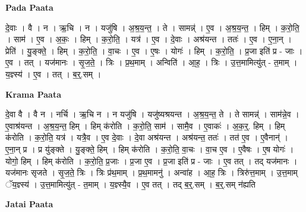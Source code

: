 \documentclass[17pt]{extarticle}
\begin{document}
\textbf{Pada Paata} \newline

दे॒वाः । वै । न । ऋ॒चि । न । यजु॑षि । अ॒श्र॒य॒न्त॒ । ते । सामन्न्॑ । ए॒व । अ॒श्र॒य॒न्त॒ । हिम् । क॒रो॒ति॒ । साम॑ । ए॒व । अ॒कः॒ । हिम् । क॒रो॒ति॒ । यत्र॑ । ए॒व । दे॒वाः । अश्र॑यन्त । ततः॑ । ए॒व । ए॒ना॒न् । प्रेति॑ । यु॒ङ्क्ते॒ । हिम् । क॒रो॒ति॒ । वा॒चः । ए॒व । ए॒षः । योगः॑ । हिम् । क॒रो॒ति॒ । प्र॒जा इति॑ प्र - जाः । ए॒व । तत् । यज॑मानः । सृ॒ज॒ते॒ । त्रिः । प्र॒थ॒माम् । अन्विति॑ । आ॒ह॒ । त्रिः । उ॒त्त॒मामित्यु॑त् - त॒माम् । य॒ज्ञ्स्य॑ । ए॒व । तत् । ब॒र्॒.सम् ।  \newline


\textbf{Krama Paata} \newline

दे॒वा वै । वै न । नर्चि । ऋ॒चि न । न यजु॑षि । यजु॑ष्यश्रयन्त । अ॒श्र॒य॒न्त॒ ते । ते सामन्न्॑ । साम॑न्ने॒व । ए॒वाश्र॑यन्त । अ॒श्र॒य॒न्त॒ हिम् । हिम् क॑रोति । क॒रो॒ति॒ साम॑ । सामै॒व । ए॒वाकः॑ । अ॒क॒र्॒. हिम् । हिम् क॑रोति । क॒रो॒ति॒ यत्र॑ । यत्रै॒व । ए॒व दे॒वाः । दे॒वा अश्र॑यन्त । अश्र॑यन्त॒ ततः॑ । तत॑ ए॒व । ए॒वैनान्॑ । ए॒ना॒न् प्र । प्र यु॑ङ्क्ते । यु॒ङ्क्ते॒ हिम् । हिम् क॑रोति । क॒रो॒ति॒ वा॒चः । वा॒च ए॒व । ए॒वैषः । ए॒ष योगः॑ । योगो॒ हिम् । हिम् क॑रोति । क॒रो॒ति॒ प्र॒जाः । प्र॒जा ए॒व । प्र॒जा इति॑ प्र - जाः । ए॒व तत् । तद् यज॑मानः । यज॑मानः सृजते । सृ॒ज॒ते॒ त्रिः । त्रिः प्र॑थ॒माम् । प्र॒थ॒मामनु॑ । अन्वा॑ह । आ॒ह॒ त्रिः । त्रिरु॑त्त॒माम् । उ॒त्त॒माम् ॅय॒ज्ञ्स्य॑ । उ॒त्त॒मामित्यु॑त् - त॒माम् । य॒ज्ञ्स्यै॒व । ए॒व तत् । तद् ब॒र्॒.सम् । ब॒र्॒.सम् न॑ह्यति \newline

\textbf{Jatai Paata} \newline
\end{document}
